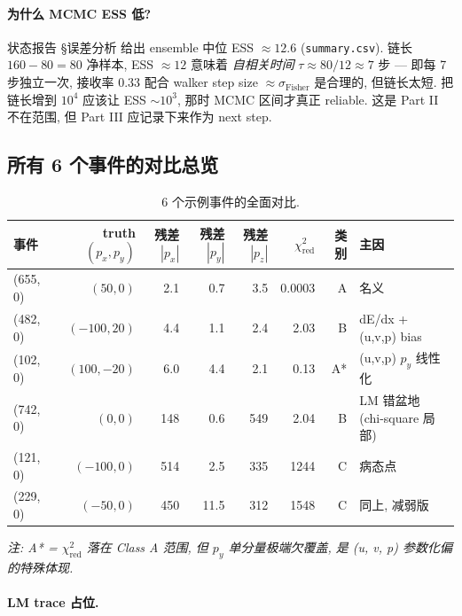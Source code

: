 \paragraph{为什么 MCMC ESS 低?}
状态报告 §误差分析 给出 ensemble 中位 ESS $\approx 12.6$ (\texttt{summary.csv}). 链长 $160 - 80 = 80$ 净样本, ESS $\approx 12$ 意味着 \emph{自相关时间} $\tau \approx 80/12 \approx 7$ 步 — 即每 7 步独立一次, 接收率 0.33 配合 walker step size $\approx \sigma_{\mathrm{Fisher}}$ 是合理的, 但链长太短. 把链长增到 $10^4$ 应该让 ESS $\sim 10^3$, 那时 MCMC 区间才真正 reliable. 这是 Part II 不在范围, 但 Part III 应记录下来作为 next step.

\subsection{所有 6 个事件的对比总览}
\label{sec:partIII:case_studies:overview}

\begin{table}[H]
\centering\scriptsize
\caption{6 个示例事件的全面对比.}
\label{tab:partIII:case_overview}
\begin{tabular}{lrrrrrrl}
\toprule
事件 & truth $(p_x, p_y)$ & 残差 $|p_x|$ & 残差 $|p_y|$ & 残差 $|p_z|$ & $\chi^2_{\mathrm{red}}$ & 类别 & 主因 \\
\midrule
(655, 0) & $(50, 0)$    & 2.1   & 0.7   & 3.5   & 0.0003 & A & 名义 \\
(482, 0) & $(-100, 20)$ & 4.4   & 1.1   & 2.4   & 2.03   & B & dE/dx + (u,v,p) bias \\
(102, 0) & $(100, -20)$ & 6.0   & 4.4   & 2.1   & 0.13   & A* & (u,v,p) $p_y$ 线性化 \\
(742, 0) & $(0, 0)$     & 148   & 0.6   & 549   & 2.04   & B & LM 错盆地 (chi-square 局部) \\
(121, 0) & $(-100, 0)$  & 514   & 2.5   & 335   & 1244   & C & 病态点 \\
(229, 0) & $(-50, 0)$   & 450   & 11.5  & 312   & 1548   & C & 同上, 减弱版 \\
\bottomrule
\end{tabular}
\end{table}
\textit{注: A* = $\chi^2_{\mathrm{red}}$ 落在 Class A 范围, 但 $p_y$ 单分量极端欠覆盖, 是 (u, v, p) 参数化偏的特殊体现.}

\paragraph{LM trace 占位.}

